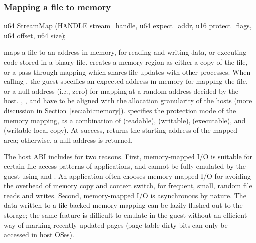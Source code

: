 


\subsubsection*{Mapping a file to memory}
                   
\begin{paldef}            
u64 StreamMap (HANDLE stream_handle, u64 expect_addr,
               u16 protect_flags, u64 offset, u64 size);
\end{paldef}


 maps a file to an address in memory, for reading and writing data, or executing code stored in a binary file.
 creates a memory region
as either a copy of the file,
or a pass-through mapping which shares file updates with other processes.
When calling ,
the guest specifies an expected address in memory for mapping the file, or a null address (i.e., zero) for mapping at a random address decided by the host.
, , and  have to be aligned
with the allocation granularity of the hosts (more discussion in Section~\ref{sec:abi:memory}).
 specifies the protection mode
of the memory mapping, as a combination of  (readable),  (writable),  (executable), and  (writable local copy).
At success,  returns the starting address of the mapped area; otherwise, a null address is returned.




The host ABI includes  for two reasons. First, memory-mapped I/O is suitable for certain file access patterns of applications, and cannot be fully emulated by the guest using  and .
An application often chooses memory-mapped I/O for
avoiding the overhead of memory copy and context switch, %
for frequent, small, random file reads and writes.
Second, memory-mapped I/O is asynchronous by nature.
The data written to a file-backed memory mapping can be lazily flushed out to the storage;
the same feature is difficult to emulate in the guest
without an efficient way of marking recently-updated pages (page table dirty bits can only be accessed in host OSes).




